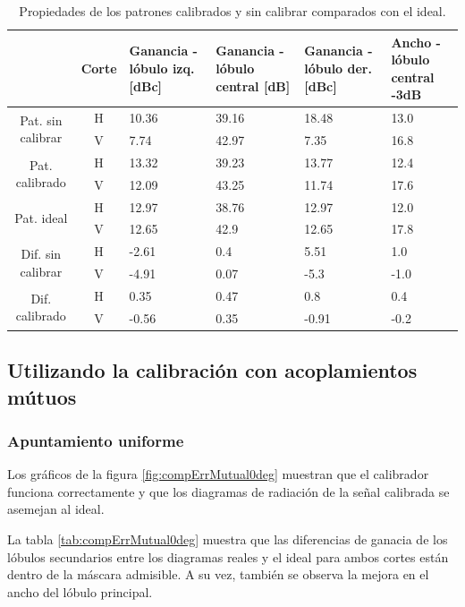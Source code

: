\begin{table}[H]
  \footnotesize
  \centering
  \begin{tabular}{|c|c|p{2cm}|p{2.5cm}|p{2.5cm}|p{2.5cm}|}
    \cline{2-6}
    \multicolumn{1}{c|}{} & Corte & Ganancia - lóbulo izq. [dBc] & Ganancia - lóbulo central [dB] &
    Ganancia - lóbulo der. [dBc] & Ancho - lóbulo central -3dB \tabularnewline\hline
    \multirow{2}{2cm}{Pat. sin calibrar} & H & 10.36 & 39.16 & 18.48 & 13.0 \tabularnewline\cline{2-6}
     & V & 7.74 & 42.97 & 7.35 & 16.8 \tabularnewline\hline
    \multirow{2}{2cm}{Pat. calibrado} & H & 13.32 & 39.23 & 13.77 & 12.4 \tabularnewline\cline{2-6}
     & V & 12.09 & 43.25 & 11.74 & 17.6 \tabularnewline\hline
    \multirow{2}{2cm}{Pat. ideal} & H & 12.97 & 38.76 & 12.97 & 12.0 \tabularnewline\cline{2-6}
     & V & 12.65 & 42.9 & 12.65 & 17.8 \tabularnewline\hline
    \multirow{2}{2cm}{Dif. sin calibrar} & H & -2.61 & 0.4 & 5.51 & 1.0\tabularnewline\cline{2-6}
     & V & -4.91 & 0.07 & -5.3 & -1.0 \tabularnewline\hline
    \multirow{2}{2cm}{Dif. calibrado} & H & 0.35 & 0.47 & 0.8 & 0.4 \tabularnewline\cline{2-6}
     & V & -0.56 & 0.35 & -0.91 & -0.2 \tabularnewline\hline
  \end{tabular}
  \caption{Propiedades de los patrones calibrados y sin calibrar comparados con el ideal.}
  \label{tab:compErrClassical10degRow}
\end{table}


\subsection{Utilizando la calibración con acoplamientos mútuos}

\subsubsection{Apuntamiento uniforme}

Los gráficos de la figura \ref{fig:compErrMutual0deg} muestran que el calibrador funciona correctamente y que los diagramas de 
radiación de la señal calibrada se asemejan al ideal. 

La tabla \ref{tab:compErrMutual0deg} muestra que las diferencias de ganacia de los lóbulos secundarios entre los diagramas 
reales y el ideal para ambos cortes están dentro de la máscara admisible. A su vez, también se observa la mejora en el ancho 
del lóbulo principal. 

